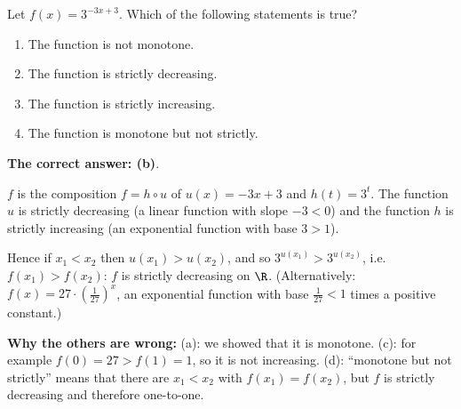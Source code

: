 
\begin{question}
Let $f(x)=3^{-3x+3}$. Which of the following statements is true?
\begin{enumerate}
  \item The function is not monotone.
  \item The function is strictly decreasing.
  \item The function is strictly increasing.
  \item The function is monotone but not strictly.
\end{enumerate}
\end{question}

\begin{solution}
\textbf{The correct answer: (b)}.

$f$ is the composition $f=h\circ u$ of $u(x)=-3x+3$ and $h(t)=3^t$. The function $u$ is strictly decreasing (a linear function with slope $-3<0$) and the function $h$ is strictly increasing (an exponential function with base $3>1$).

Hence if $x_1<x_2$ then $u(x_1)>u(x_2)$, and so $3^{u(x_1)}>3^{u(x_2)}$, i.e. $f(x_1)>f(x_2)$: $f$ is strictly decreasing on $\R$.
(Alternatively: $f(x)=27\cdot\left(\frac{1}{27}\right)^{x}$, an exponential function with base $\frac1{27}<1$ times a positive constant.)

\textbf{Why the others are wrong:} (a): we showed that it is monotone. (c): for example $f(0)=27>f(1)=1$, so it is not increasing. (d): ``monotone but not strictly'' means that there are $x_1<x_2$ with $f(x_1)=f(x_2)$, but $f$ is strictly decreasing and therefore one-to-one.
\end{solution}
